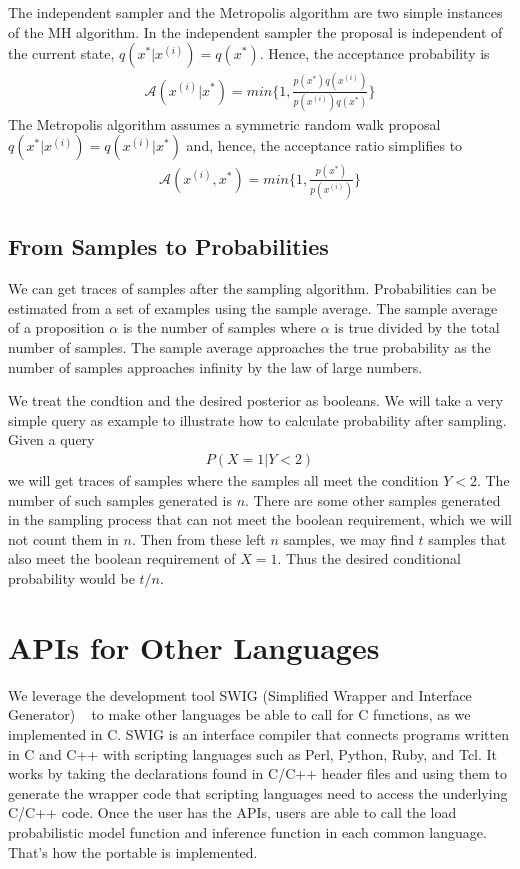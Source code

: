 The independent sampler and the Metropolis algorithm are two simple instances of the MH algorithm. In the independent sampler the proposal is independent of the current state, $q(x^* | x^{(i)}) = q(x^*)$. Hence, the acceptance probability is
\begin{align*}
  \mathscr{A}(x^{(i)} | x^*) = min \{1, \frac{p(x^*)q(x^{(i)})}{p(x^{(i)})q(x^*)}\}
\end{align*}
The Metropolis algorithm assumes a symmetric random walk proposal $q(x^* | x^{(i)}) = q(x^{(i)} | x^*)$ and, hence, the acceptance ratio simplifies to
\begin{align*}
  \mathscr{A}(x^{(i)}, x^*) = min \{ 1, \frac{p(x^*)}{p(x^{(i)})} \}
\end{align*}

\subsection{From Samples to Probabilities}
We can get traces of samples after the sampling algorithm. Probabilities can be estimated from a set of examples using the sample average. The sample average of a proposition $\alpha$ is the number of samples where $\alpha$ is true divided by the total number of samples. The sample average approaches the true probability as the number of samples approaches infinity by the law of large numbers.

We treat the condtion and the desired posterior as booleans. We will take a very simple query as example to illustrate how to calculate probability after sampling. Given a query
\begin{align*}
  P (X = 1| Y < 2)
\end{align*}
we will get traces of samples where the samples all meet the condition $Y < 2$. The number of such samples generated is $n$. There are some other samples generated in the sampling process that can not meet the boolean requirement, which we will not count them in $n$. Then from these left $n$ samples, we may find $t$ samples that also meet the boolean requirement of $X = 1$. Thus the desired conditional probability would be $t / n$.

\section{APIs for Other Languages}
\label{sec:api}
We leverage the development tool SWIG (Simplified Wrapper and Interface Generator) ~\cite{swig} to make other languages be able to call for C functions, as we implemented in C. SWIG is an interface compiler that connects programs written in C and C++ with scripting languages such as Perl, Python, Ruby, and Tcl. It works by taking the declarations found in C/C++ header files and using them to generate the wrapper code that scripting languages need to access the underlying C/C++ code. Once the user has the APIs, users are able to call the load probabilistic model function and inference function in each common language. That's how the portable is implemented. 

